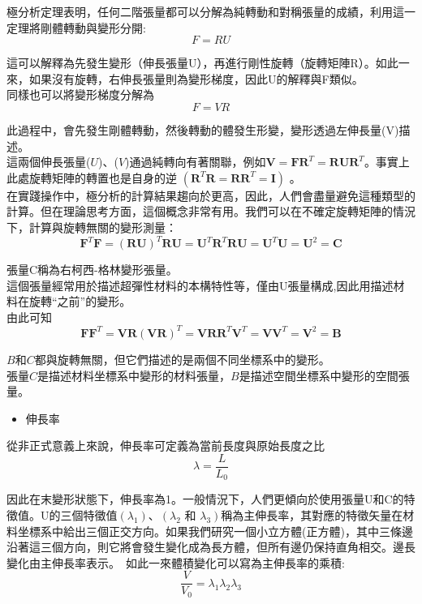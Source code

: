 極分析定理表明，任何二階張量都可以分解為純轉動和對稱張量的成績，利用這一定理將剛體轉動與變形分開:\
$$F=R U$$

這可以解釋為先發生變形（伸長張量U），再進行剛性旋轉（旋轉矩陣R）。如此一來，如果沒有旋轉，右伸長張量則為變形梯度，因此U的解釋與F類似。\\

同樣也可以將變形梯度分解為\
$$F=V R$$

此過程中，會先發生剛體轉動，然後轉動的體發生形變，變形透過左伸長量(V)描述。\\

這兩個伸長張量($U$)、($V$)通過純轉向有著關聯，例如$\mathbf{V}=\mathbf{F R}^T=\mathbf{R} \mathbf{U} \mathbf{R}^T$。事實上此處旋轉矩陣的轉置也是自身的逆 $\left(\mathbf{R}^T \mathbf{R}=\mathbf{R R}^T=\mathbf{I}\right)$ 。\\

在實踐操作中，極分析的計算結果趨向於更高，因此，人們會盡量避免這種類型的計算。但在理論思考方面，這個概念非常有用。我們可以在不確定旋轉矩陣的情況下，計算與旋轉無關的變形測量：\
$$\mathbf{F}^T \mathbf{F}=(\mathbf{R U})^T \mathbf{R} \mathbf{U}=\mathbf{U}^T \mathbf{R}^T \mathbf{R} \mathbf{U}=\mathbf{U}^T \mathbf{U}=\mathbf{U}^2=\mathbf{C}$$

張量C稱為右柯西-格林變形張量。\\

這個張量經常用於描述超彈性材料的本構特性等，僅由U張量構成,因此用描述材料在旋轉“之前”的變形。\\

由此可知\
$$\mathbf{F} \mathbf{F}^T=\mathbf{V R}(\mathbf{V R})^T=\mathbf{V R R}^T \mathbf{V}^T=\mathbf{V} \mathbf{V}^T=\mathbf{V}^2=\mathbf{B}$$

$B$和$C$都與旋轉無關，但它們描述的是兩個不同坐標系中的變形。\\

張量$C$是描述材料坐標系中變形的材料張量，$B$是描述空間坐標系中變形的空間張量。\\

\begin{itemize}
\item 伸長率
\end{itemize}
從非正式意義上來說，伸長率可定義為當前長度與原始長度之比\
$$\lambda=\frac{L}{L_0}$$

因此在末變形狀態下，伸長率為1。一般情況下，人們更傾向於使用張量U和C的特徵值。U的三個特徵值$\left(\lambda_1\right)$、$\left(\lambda_2\right.$ 和 $\left.\lambda_3\right)$稱為主伸長率，其對應的特徵矢量在材料坐標系中給出三個正交方向。如果我們研究一個小立方體(正方體)，其中三條邊沿著這三個方向，則它將會發生變化成為長方體，但所有邊仍保持直角相交。邊長變化由主伸長率表示。\
如此一來體積變化可以寫為主伸長率的乘積:\
$$\frac{V}{V_0}=\lambda_1 \lambda_2 \lambda_3$$\

